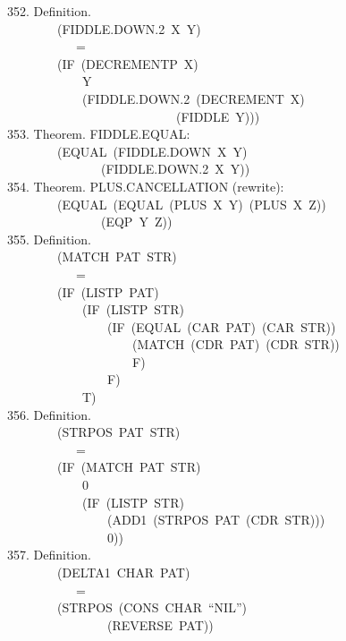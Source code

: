 \documentclass[10pt]{book}
\newenvironment{pubasis}{\begin{flushleft}}{\end{flushleft}}
\begin{document}
\begin{pubasis}
352.    Definition.\\
~~~~~~~~(FIDDLE.DOWN.2~X~Y)\\
~~~~~~~~~~~=\\
~~~~~~~~(IF~(DECREMENTP~X)\\
~~~~~~~~~~~~Y\\
~~~~~~~~~~~~(FIDDLE.DOWN.2~(DECREMENT~X)\\
~~~~~~~~~~~~~~~~~~~~~~~~~~~(FIDDLE~Y)))\\

353.    Theorem.  FIDDLE.EQUAL:\\
~~~~~~~~(EQUAL~(FIDDLE.DOWN~X~Y)\\
~~~~~~~~~~~~~~~(FIDDLE.DOWN.2~X~Y))\\

354.    Theorem.  PLUS.CANCELLATION (rewrite):\\
~~~~~~~~(EQUAL~(EQUAL~(PLUS~X~Y)~(PLUS~X~Z))\\
~~~~~~~~~~~~~~~(EQP~Y~Z))\\

355.    Definition.\\
~~~~~~~~(MATCH~PAT~STR)\\
~~~~~~~~~~~=\\
~~~~~~~~(IF~(LISTP~PAT)\\
~~~~~~~~~~~~(IF~(LISTP~STR)\\
~~~~~~~~~~~~~~~~(IF~(EQUAL~(CAR~PAT)~(CAR~STR))\\
~~~~~~~~~~~~~~~~~~~~(MATCH~(CDR~PAT)~(CDR~STR))\\
~~~~~~~~~~~~~~~~~~~~F)\\
~~~~~~~~~~~~~~~~F)\\
~~~~~~~~~~~~T)\\

356.    Definition.\\
~~~~~~~~(STRPOS~PAT~STR)\\
~~~~~~~~~~~=\\
~~~~~~~~(IF~(MATCH~PAT~STR)\\
~~~~~~~~~~~~0\\
~~~~~~~~~~~~(IF~(LISTP~STR)\\
~~~~~~~~~~~~~~~~(ADD1~(STRPOS~PAT~(CDR~STR)))\\
~~~~~~~~~~~~~~~~0))\\

357.    Definition.\\
~~~~~~~~(DELTA1~CHAR~PAT)\\
~~~~~~~~~~~=\\
~~~~~~~~(STRPOS~(CONS~CHAR~``NIL'')\\
~~~~~~~~~~~~~~~~(REVERSE~PAT))\\


\end{pubasis}
\end{document}
